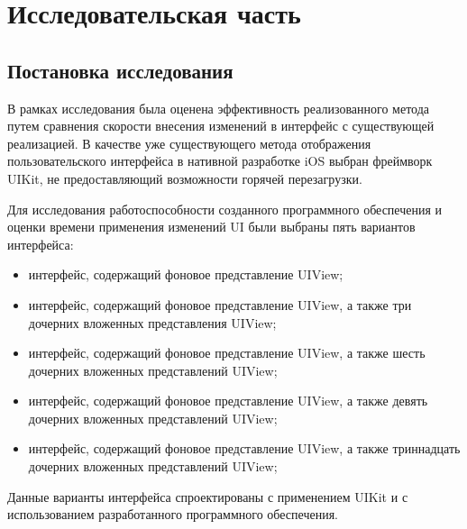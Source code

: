 \section{Исследовательская часть}

\subsection{Постановка исследования}

В рамках исследования была оценена эффективность реализованного метода путем сравнения скорости внесения изменений в интерфейс с существующей реализацией.
В качестве уже существующего метода отображения пользовательского интерфейса в нативной разработке iOS выбран фреймворк UIKit, не предоставляющий возможности горячей перезагрузки.

Для исследования работоспособности созданного программного обеспечения и оценки времени применения изменений UI были выбраны пять вариантов интерфейса:
\begin{itemize}[label=---]
	\item интерфейс, содержащий фоновое представление UIView;
	\item интерфейс, содержащий фоновое представление UIView, а также три дочерних вложенных представления UIView;
	\item интерфейс, содержащий фоновое представление UIView, а также шесть дочерних вложенных представлений UIView;
	\item интерфейс, содержащий фоновое представление UIView, а также девять дочерних вложенных представлений UIView;
	\item интерфейс, содержащий фоновое представление UIView, а также триннадцать дочерних вложенных представлений UIView;
\end{itemize}	

Данные варианты интерфейса спроектированы с применением UIKit и с использованием разработанного программного обеспечения.



